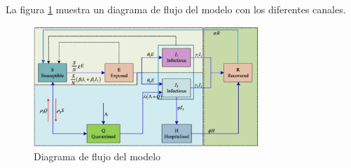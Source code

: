 \documentclass[conference]{IEEEtran}
\begin{document}
La figura \ref{block_diagram} muestra un diagrama de flujo del modelo con los diferentes canales.

\begin{figure}[h]
    \centering
    \includegraphics[width=8.5cm]{../Figures/Model_flowchart.png}
    \caption{Diagrama de flujo del modelo}
    \label{block_diagram}
\end{figure}
\end{document}
